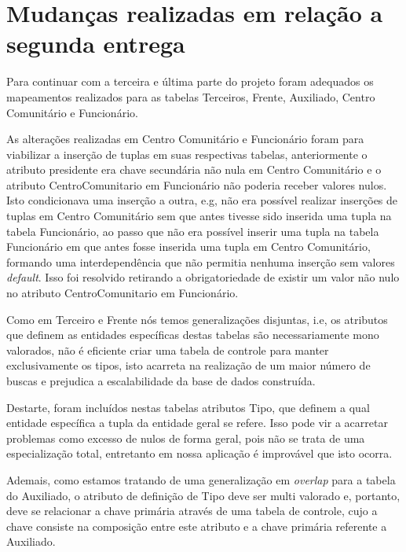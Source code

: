 \section{Mudanças realizadas em relação a segunda entrega}
Para continuar com a terceira e última parte do projeto foram adequados os mapeamentos realizados para as tabelas Terceiros, Frente, Auxiliado, Centro Comunitário e Funcionário.

As alterações realizadas em Centro Comunitário e Funcionário foram para viabilizar a inserção de tuplas em suas respectivas tabelas, anteriormente o atributo presidente era chave secundária não nula em Centro Comunitário e o atributo CentroComunitario em Funcionário não poderia receber valores nulos. Isto condicionava uma inserção a outra, e.g, não era possível realizar inserções de tuplas em Centro Comunitário sem que antes tivesse sido inserida uma tupla na tabela Funcionário, ao passo que não era possível inserir uma tupla na tabela Funcionário em que antes fosse inserida uma tupla em Centro Comunitário, formando uma interdependência que não permitia nenhuma inserção sem valores \textit{default}. Isso foi resolvido retirando a obrigatoriedade de existir um valor não nulo no atributo CentroComunitario em Funcionário.

Como em Terceiro e Frente nós temos generalizações disjuntas, i.e,  os atributos que definem as entidades específicas destas tabelas são necessariamente mono valorados, não é eficiente criar uma tabela de controle para manter exclusivamente os tipos, isto acarreta na realização de um maior número de buscas e prejudica a escalabilidade da base de dados construída. 

Destarte, foram incluídos nestas tabelas atributos Tipo, que definem a qual entidade específica a tupla da entidade geral se refere. Isso pode vir a acarretar problemas como excesso de nulos de forma geral, pois não se trata de uma especialização total, entretanto em nossa aplicação é improvável que isto ocorra.

Ademais, como estamos tratando de uma generalização em \textit{overlap} para a tabela do Auxiliado, o atributo de definição de Tipo deve ser multi valorado e, portanto, deve se relacionar a chave primária através de uma tabela de controle, cujo a chave consiste na composição entre este atributo e a chave primária referente a Auxiliado.

